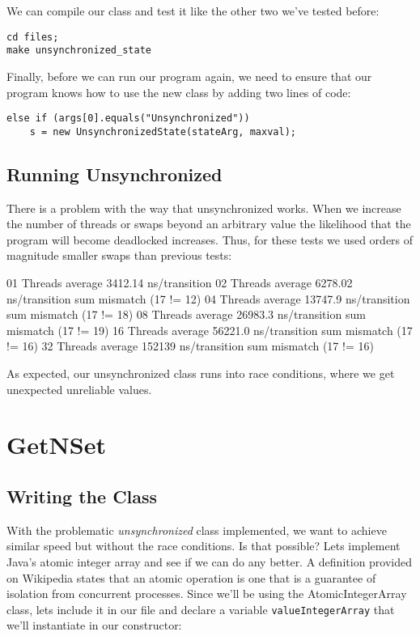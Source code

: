 \documentclass[11pt]{article}
\begin{document}
We can compile our class and test it like the other two we've
tested before:

\begin{verbatim}
cd files;
make unsynchronized_state
\end{verbatim}

Finally, before we can run our program again, we need to ensure that
our program knows how to use the new class by adding two lines of code:
\begin{verbatim}
else if (args[0].equals("Unsynchronized"))
    s = new UnsynchronizedState(stateArg, maxval);
\end{verbatim}

\subsection{Running Unsynchronized}
\label{sec-4-1}
There is a problem with the way that unsynchronized works. When we
increase the number of threads or swaps beyond an arbitrary value
the likelihood that the program will become deadlocked increases.
Thus, for these tests we used orders of magnitude smaller swaps
than previous tests:

01 Threads average 3412.14 ns/transition
02 Threads average 6278.02 ns/transition
sum mismatch (17 != 12)
04 Threads average 13747.9 ns/transition
sum mismatch (17 != 18)
08 Threads average 26983.3 ns/transition
sum mismatch (17 != 19)
16 Threads average 56221.0 ns/transition
sum mismatch (17 != 16)
32 Threads average 152139 ns/transition
sum mismatch (17 != 16)

As expected, our unsynchronized class runs into race conditions, where we
get unexpected unreliable values.

\section{GetNSet}
\label{sec-5}
\subsection{Writing the Class}
\label{sec-5-1}
With the problematic \emph{unsynchronized} class implemented, we want
to achieve similar speed but without the race conditions. Is that
possible? Lets implement Java's atomic integer array and see if
we can do any better. A definition provided on Wikipedia states
that an atomic operation is one that is a guarantee of isolation
from concurrent processes. Since we'll be using the
AtomicIntegerArray class, lets include it in our file and
declare a variable \verb~valueIntegerArray~ that we'll instantiate
in our constructor:
\end{document}
